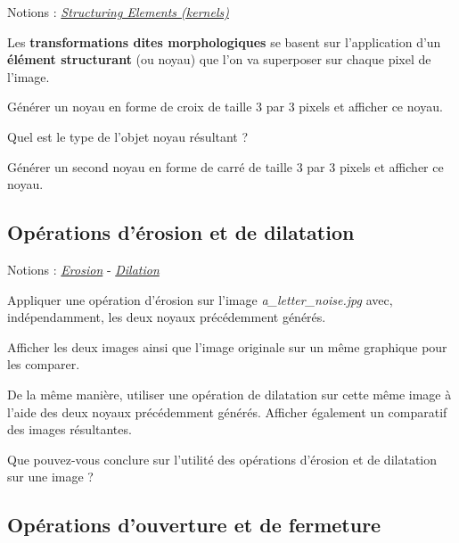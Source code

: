 \documentclass[a4paper,11pt,titlepage]{article} %
\begin{document}
\begin{mdframed}[style=sidebar,frametitle={}]
Notions : \href{https://iogs-lense-training.github.io/image-processing/contents/opencv_erod_dila.html#kernels-for-erosion-and-dilation}{\textit{Structuring Elements (kernels)}} 
\end{mdframed}

Les \textbf{transformations dites morphologiques} se basent sur l'application d'un \textbf{élément structurant} (ou noyau) que l'on va superposer sur chaque pixel de l'image. 

\Manip Générer un noyau en forme de croix de taille 3 par 3 pixels et afficher ce noyau.

\Quest Quel est le type de l'objet noyau résultant ?

\Manip Générer un second noyau en forme de carré de taille 3 par 3 pixels et afficher ce noyau.

\newpage
\subsection{Opérations d'érosion et de dilatation}

\begin{mdframed}[style=sidebar,frametitle={}]
Notions : \href{https://iogs-lense-training.github.io/image-processing/contents/opencv_erod_dila.html#erosion-operation}{\textit{Erosion}} - \href{https://iogs-lense-training.github.io/image-processing/contents/opencv_erod_dila.html#dilation-operation}{\textit{Dilation}} 
\end{mdframed}

\Manip Appliquer une opération d'érosion sur l'image \textsl{a\_letter\_noise.jpg} avec, indépendamment, les deux noyaux précédemment générés. 

\Manip Afficher les deux images ainsi que l'image originale sur un même graphique pour les comparer.

\Manip De la même manière, utiliser une opération de dilatation sur cette même image à l'aide des deux noyaux précédemment générés. Afficher également un comparatif des images résultantes.

\Quest Que pouvez-vous conclure sur l'utilité des opérations d'érosion et de dilatation sur une image ?

\subsection{Opérations d'ouverture et de fermeture}
\end{document}
